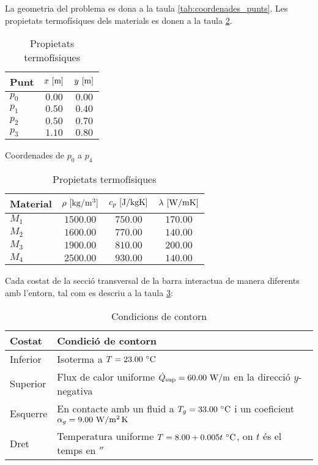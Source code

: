 \noindent
La geometria del problema es dona a la taula \ref{tab:coordenades_punts}. Les propietats termofísiques dels materials es donen a la taula \ref{tab:propietats_termofisiques}.
\begin{table}[h]
	\begin{minipage}[t]{.5\linewidth}
		\centering
		\begin{tabular}[t]{lcc}
			\toprule[0.5mm]
			Punt & $x \ [\meter]$ & $y \ [\meter]$ \\
			\midrule[0.25mm]
			$p_0$ & $0.00$ & $0.00$ \\			
			$p_1$ & $0.50$ & $0.40$ \\
			$p_2$ & $0.50$ & $0.70$ \\
			$p_3$ & $1.10$ & $0.80$ \\		
			\bottomrule[0.5mm]
		\end{tabular}
		\caption{Coordenades de $p_0$ a $p_4$}
		\label{tab:coordenades_punts}
	\end{minipage}%
	\begin{minipage}[t]{.5\linewidth}
		\centering
		\begin{tabular}[t]{lccc}
			\toprule[0.5mm]
			Material & $\rho \ [\kilo\gram / \meter^3]$ & $c_p \ [\joule / \kilo\gram \kelvin]$ & $\lambda \ [\watt / \meter \kelvin]$ \\
			\midrule[0.25mm]
			$M_1$ & $1500.00$ & $750.00$ & $170.00$ \\
			$M_2$ & $1600.00$ & $770.00$ & $140.00$ \\
			$M_3$ & $1900.00$ & $810.00$ & $200.00$ \\
			$M_4$ & $2500.00$ & $930.00$ & $140.00$ \\	
			\bottomrule[0.5mm]
		\end{tabular}
		\caption{Propietats termofísiques}
		\label{tab:propietats_termofisiques}
	\end{minipage} 
\end{table}

\noindent
Cada costat de la secció transversal de la barra interactua de manera diferents amb l'entorn, tal com es descriu a la taula \ref{tab:condicions_contorn}:
\begin{table}[h]
	\centering
	\begin{tabular}{ll}
		\toprule[0.5mm]
		Costat 		& Condició de contorn \\
		\midrule[0.25mm]
		Inferior 	& Isoterma a $T = 23.00 \ \celsius$ \\
		Superior 	& Flux de calor uniforme $\dot{Q}_\text{sup} = 60.00 \ \watt / \meter$ en la direcció $y$-negativa \\
		Esquerre 	& En contacte amb un fluid a $T_g = 33.00 \ \celsius$ i un coeficient $\alpha_g = 9.00 \ \watt / \meter^2 \, \kelvin$ \\
		Dret 		& Temperatura uniforme $T = 8.00 + 0.005 t \ \celsius$, on $t$ és el temps en $\second$ \\
		\bottomrule[0.5mm]
	\end{tabular}
	\caption{Condicions de contorn}
	\label{tab:condicions_contorn}
\end{table}

